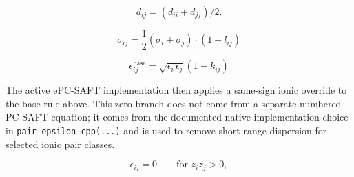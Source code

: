 \documentclass[12pt, letterpaper]{article}
\begin{document}
\begin{equation}
    d_{i j}=\left(d_{i i}+d_{j j}\right) / 2 .
    \label{eq:d_ij}
\end{equation}


\begin{equation}
    \sigma_{i j}=\frac{1}{2}\left(\sigma_{i}+\sigma_{j}\right) \cdot \left(1- l_{ij} \right)
    \label{eq:sigma_ij}
\end{equation}


\begin{equation}
    \epsilon_{ij}^{\mathrm{base}}
    =
    \sqrt{\epsilon_{i}\,\epsilon_{j}}\left(1-k_{ij}\right)
    \label{eq:epsilon_ij_mixing}
\end{equation}


The active ePC-SAFT implementation then applies a same-sign ionic override to the base rule above. This zero branch does not come from a separate numbered PC-SAFT equation; it comes from the documented native implementation choice in \texttt{pair\_epsilon\_cpp(...)} and is used to remove short-range dispersion for selected ionic pair classes.

\begin{equation}
    \epsilon_{ij}=0
    \qquad \text{for } z_{i}z_{j}>0,
\label{eq:epsilon_ij_ionic_zero}
\end{equation}
\end{document}
